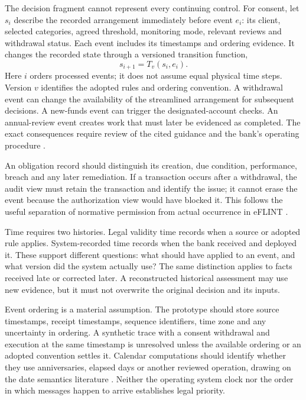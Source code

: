 The decision fragment cannot represent every continuing control. For consent,
let $s_i$ describe the recorded arrangement immediately before event $e_i$:
its client, selected categories, agreed threshold, monitoring mode, relevant
reviews and withdrawal status. Each event includes its timestamps and ordering
evidence. It changes the recorded state through a
versioned transition function,
\begin{equation}
 s_{i+1}=T_v(s_i,e_i).
 \label{eq:transition}
\end{equation}
Here $i$ orders processed events; it does not assume equal physical time
steps. Version $v$ identifies the adopted rules and ordering convention. A
withdrawal event can change the availability of the streamlined arrangement for
subsequent decisions. A new-funds event can trigger the designated-account
checks. An annual-review event creates work that must later be evidenced as
completed. The exact consequences require review of the cited guidance and the
bank's operating procedure \citep{sfcspiannex1,sfcspiannex2}.


An obligation record should distinguish its creation, due condition, performance,
breach and any later remediation. If a transaction occurs after a withdrawal, the
audit view must retain the transaction and identify the issue; it cannot erase
the event because the authorization view would have blocked it. This follows the
useful separation of normative permission from actual occurrence in eFLINT
\citep{eflint2026}.

Time requires two histories. Legal validity time records when a source or adopted
rule applies. System-recorded time records when the bank received and deployed
it. These support different questions: what should have applied to an event, and
what version did the system actually use? The same distinction applies to facts
received late or corrected later. A reconstructed historical assessment may use
new evidence, but it must not overwrite the original decision and its inputs.

Event ordering is a material assumption. The prototype should store source
timestamps, receipt timestamps, sequence identifiers, time zone and any uncertainty
in ordering. A synthetic trace with a consent withdrawal and execution at the
same timestamp is unresolved unless the available ordering or an adopted
convention settles it. Calendar computations should identify whether they use
anniversaries, elapsed days or another reviewed operation, drawing on the date
semantics literature \citep{dates2024}. Neither the operating system clock nor the
order in which messages happen to arrive establishes legal priority.

